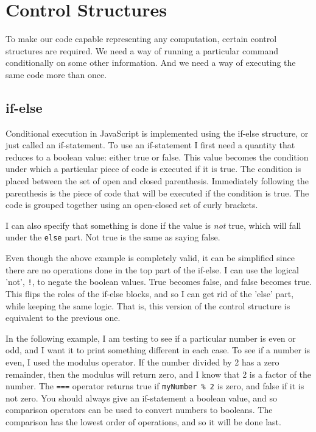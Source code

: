 \chapter{Control Structures}

To make our code capable representing any computation, certain control structures are required. We need a way of running a particular command conditionally on some other information. And we need a way of executing the same code more than once.

\section{if-else}


Conditional execution in JavaScript is implemented using the if-else structure, or just called an if-statement. To use an if-statement I first need a quantity that reduces to a boolean value: either true or false. This value becomes the condition under which a particular piece of code is executed if it is true. The condition is placed between the set of open and closed parenthesis. Immediately following the parenthesis is the piece of code that will be executed if the condition is true. The code is grouped together using an open-closed set of curly brackets.


I can also specify that something is done if the value is \textit{not} true, which will fall under the \texttt{else} part. Not true is the same as saying false.


Even though the above example is completely valid, it can be simplified since there are no operations done in the top part of the if-else. I can use the logical 'not', \texttt{!}, to negate the boolean values. True becomes false, and false becomes true. This flips the roles of the if-else blocks, and so I can get rid of the 'else' part, while keeping the same logic. That is, this version of the control structure is equivalent to the previous one.


In the following example, I am testing to see if a particular number is even or odd, and I want it to print something different in each case. To see if a number is even, I used the modulus operator. If the number divided by 2 has a zero remainder, then the modulus will return zero, and I know that 2 is a factor of the number. The \texttt{===} operator returns true if \texttt{myNumber \% 2} is zero, and false if it is not zero. You should always give an if-statement a boolean value, and so comparison operators can be used to convert numbers to booleans. The comparison has the lowest order of operations, and so it will be done last.\\


